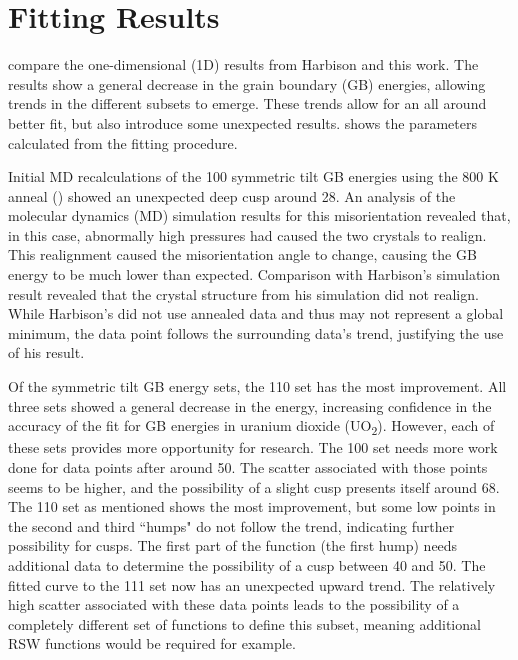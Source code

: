 \documentclass[twoside,senior]{BYUPhys}
\begin{document}
\section{Fitting Results\label{results:fit}}
 compare the one-dimensional (1D) results from Harbison\cite{harbison2015} and this work.  The results show a general decrease in the grain boundary (GB) energies, allowing trends in the different subsets to emerge.  These trends allow for an all around better fit, but also introduce some unexpected results.   shows the parameters calculated from the fitting procedure.

Initial MD recalculations of the \textlangle{}100\textrangle{} symmetric tilt GB energies using the 800 K anneal () showed an unexpected deep cusp around 28\textdegree{}.  An analysis of the molecular dynamics (MD) simulation results for this misorientation revealed that, in this case, abnormally high pressures had caused the two crystals to realign.  This realignment caused the misorientation angle to change, causing the GB energy to be much lower than expected.  Comparison with Harbison's simulation result revealed that the crystal structure from his simulation did not realign.  While Harbison's did not use annealed data and thus may not represent a global minimum, the data point follows the surrounding data's trend, justifying the use of his result.

Of the symmetric tilt GB energy sets, the \textlangle{}110\textrangle{} set has the most improvement.  All three sets showed a general decrease in the energy, increasing confidence in the accuracy of the fit for GB energies in uranium dioxide (UO\textsubscript{2}).  However, each of these sets provides more opportunity for research.  The \textlangle{}100\textrangle{} set needs more work done for data points after around 50\textdegree{}.  The scatter associated with those points seems to be higher, and the possibility of a slight cusp presents itself around 68\textdegree{}.  The \textlangle{}110\textrangle{} set as mentioned shows the most improvement, but some low points in the second and third ``humps" do not follow the trend, indicating further possibility for cusps.  The first part of the function (the first hump) needs additional data to determine the possibility of a cusp between 40\textdegree{} and 50\textdegree{}.  The fitted curve to the \textlangle{}111\textrangle{} set now has an unexpected upward trend.  The relatively high scatter associated with these data points leads to the possibility of a completely different set of functions to define this subset, meaning additional RSW functions would be required for example.
\end{document}
